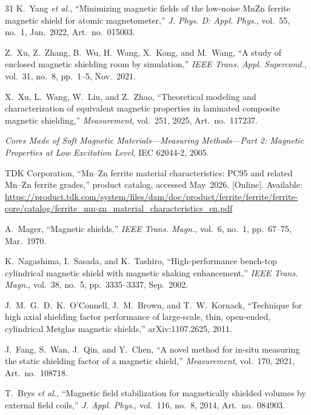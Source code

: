 \documentclass[letterpaper,journal]{IEEEtran}
\begin{document}
\begin{thebibliography}{31}
K.~Yang \textit{et al.},
``Minimizing magnetic fields of the low-noise MnZn ferrite magnetic shield for atomic magnetometer,''
\textit{J. Phys. D: Appl. Phys.}, vol.~55, no.~1, Jan.~2022, Art.~no.~015003.

Z.~Xu, Z.~Zhang, B.~Wu, H.~Wang, X.~Kong, and M.~Wang,
``A study of enclosed magnetic shielding room by simulation,''
\textit{IEEE Trans. Appl. Supercond.}, vol.~31, no.~8, pp.~1--5, Nov.~2021.

X.~Xu, L.~Wang, W.~Liu, and Z.~Zhao,
``Theoretical modeling and characterization of equivalent magnetic properties in laminated composite magnetic shielding,''
\textit{Measurement}, vol.~251, 2025, Art.~no.~117237.

\textit{Cores Made of Soft Magnetic Materials---Measuring Methods---Part 2: Magnetic Properties at Low Excitation Level}, IEC 62044-2, 2005.

TDK Corporation,
``Mn--Zn ferrite material characteristics: PC95 and related Mn--Zn ferrite grades,''
product catalog, accessed May~2026. [Online]. Available: \url{https://product.tdk.com/system/files/dam/doc/product/ferrite/ferrite/ferrite-core/catalog/ferrite_mn-zn_material_characteristics_en.pdf}

A.~Mager,
``Magnetic shields,''
\textit{IEEE Trans. Magn.}, vol.~6, no.~1, pp.~67--75, Mar.~1970.

K.~Nagashima, I.~Sasada, and K.~Tashiro,
``High-performance bench-top cylindrical magnetic shield with magnetic shaking enhancement,''
\textit{IEEE Trans. Magn.}, vol.~38, no.~5, pp.~3335--3337, Sep.~2002.

J.~M.~G.~D.~K.~O'Connell, J.~M.~Brown, and T.~W.~Kornack,
``Technique for high axial shielding factor performance of large-scale, thin, open-ended, cylindrical Metglas magnetic shields,''
arXiv:1107.2625, 2011.

J.~Fang, S.~Wan, J.~Qin, and Y.~Chen,
``A novel method for in-situ measuring the static shielding factor of a magnetic shield,''
\textit{Measurement}, vol.~170, 2021, Art.~no.~108718.

T.~Brys \textit{et al.},
``Magnetic field stabilization for magnetically shielded volumes by external field coils,''
\textit{J. Appl. Phys.}, vol.~116, no.~8, 2014, Art.~no.~084903.

\end{thebibliography}
\end{document}
